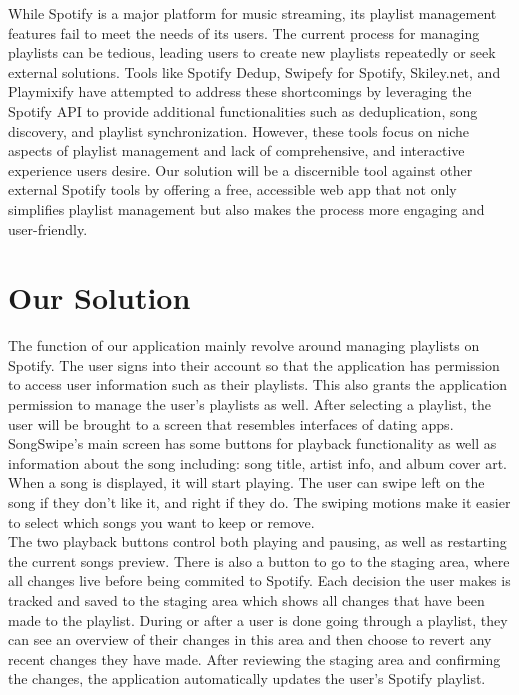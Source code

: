 \documentclass{article}
\begin{document}
While Spotify is a major platform for music streaming, its playlist management features fail to meet the needs of its users. The current process for managing playlists can be tedious, leading users to create new playlists repeatedly or seek external solutions. Tools like Spotify Dedup, Swipefy for Spotify, Skiley.net, and Playmixify have attempted to address these shortcomings by leveraging the Spotify API to provide additional functionalities such as deduplication, song discovery, and playlist synchronization. However, these tools focus on niche aspects of playlist management and lack of comprehensive, and interactive experience users desire. Our solution will be a discernible tool against other external Spotify tools by offering a free, accessible web app that not only simplifies playlist management but also makes the process more engaging and user-friendly.
 

\section{Our Solution}
\quad The function of our application mainly revolve around managing playlists on Spotify. The user signs into their account so that the application has permission to access user information such as their playlists. This also grants the application permission to manage the user's playlists as well. After selecting a playlist, the user will be brought to a screen that resembles interfaces of dating apps. SongSwipe's main screen has some buttons for playback functionality as well as information about the song including: song title, artist info, and album cover art. When a song is displayed, it will start playing. The user can swipe left on the song if they don't like it, and right if they do. The swiping motions make it easier to select which songs you want to keep or remove.\\

\quad The two playback buttons control both playing and pausing, as well as restarting the current songs preview.  There is also a button to go to the staging area, where all changes live before being commited to Spotify. Each decision the user makes is tracked and saved to the staging area which shows all changes that have been made to the playlist. During or after a user is done going through a playlist, they can see an overview of their changes in this area and then choose to revert any recent changes they have made. After reviewing the staging area and confirming the changes, the application automatically updates the user's Spotify playlist. \\
\end{document}
